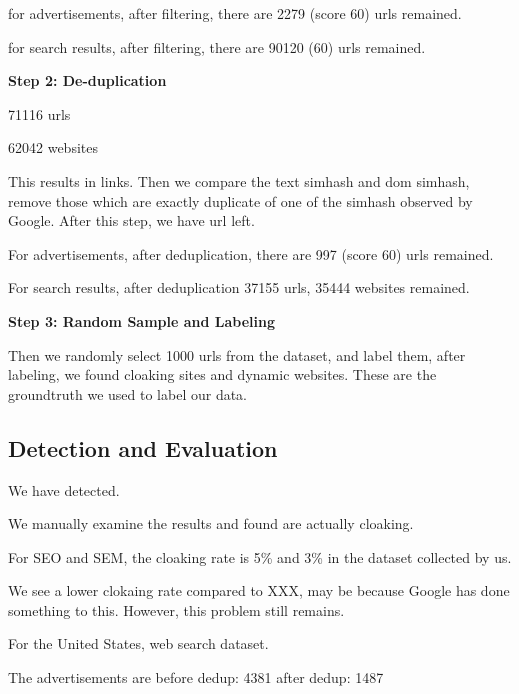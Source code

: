for advertisements, after filtering, there are 2279 (score 60) urls
remained.

for search results, after filtering, there are 90120 (60) urls remained.


\bf{Step 2: De-duplication}

71116 urls

62042 websites


This results in  links. Then we compare the text simhash and dom
simhash, remove those which are exactly duplicate of one of the simhash observed
by Google. After this step, we have  url left.

For advertisements, after deduplication, there are 997 (score 60) urls remained.

For search results, after deduplication 37155 urls, 35444 websites remained.


\bf{Step 3: Random Sample and Labeling}


Then we randomly select 1000 urls from the dataset, and label them, after
labeling, we found  cloaking sites and  dynamic websites.
These are the groundtruth we used to label our data.

\subsection{Detection and Evaluation}
We have detected.

We manually examine the results and found  are actually cloaking.

For SEO and SEM, the cloaking rate is 5\% and 3\% in the dataset collected by
us.




We see a lower clokaing rate compared to XXX, may be because Google has done
something to this. However, this problem still remains.


For the United States, web search dataset.

The advertisements are
before dedup: 4381
after dedup: 1487

